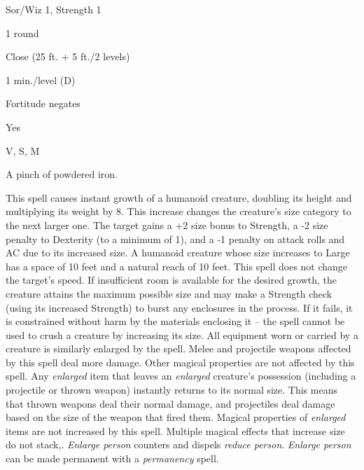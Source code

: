
\begin{description*}
\item[Level:] Sor/Wiz 1, Strength 1
\item[Casting Time:] 1 round
\item[Range:] Close (25 ft. + 5 ft./2 levels)
\item[Duration:] 1 min./level (D)
\item[Saving Throw:] Fortitude negates
\item[Spell Resistance:] Yes
\item[Components:] V, S, M
\item[Arcane Material Component:] A pinch of powdered iron.
\end{description*}

This spell causes instant growth of a humanoid creature, doubling its height and
multiplying its weight by 8. This increase changes the creature's size category
to the next larger one. The target gains a +2 size bonus to Strength, a -2 size
penalty to Dexterity (to a minimum of 1), and a -1 penalty on attack rolls and
AC due to its increased size.
A humanoid creature whose size increases to Large has a space of 10 feet and a
natural reach of 10 feet. This spell does not change the target's speed.
If insufficient room is available for the desired growth, the creature attains
the maximum possible size and may make a Strength check (using its increased Strength)
to burst any enclosures in the process. If it fails, it is constrained without
harm by the materials enclosing it --  the spell cannot be used to crush a creature
by increasing its size.
All equipment worn or carried by a creature is similarly enlarged by the spell.
Melee and projectile weapons affected by this spell deal more damage. Other magical
properties are not affected by this spell. Any \textit{enlarged} item that leaves
an \textit{enlarged} creature's possession (including a projectile or thrown weapon)
instantly returns to its normal size. This means that thrown weapons deal their
normal damage, and projectiles deal damage based on the size of the weapon that
fired them. Magical properties of \textit{enlarged} items are not increased by
this spell.
Multiple magical effects that increase size do not stack,.
\textit{Enlarge person} counters and dispels \textit{reduce person}.
\textit{Enlarge person} can be made permanent with a \textit{permanency} spell.